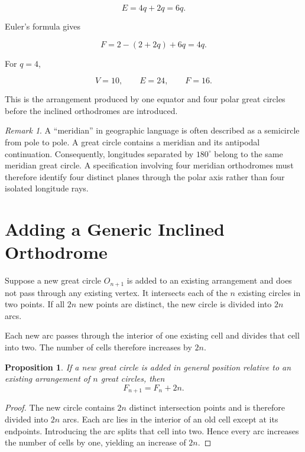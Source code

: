 \documentclass[11pt,fleqn]{book}
\numberwithin{equation}{chapter}
\theoremstyle{plain}
\newtheorem{proposition}[theorem]{Proposition}
\theoremstyle{definition}
\theoremstyle{remark}
\newtheorem{remark}[theorem]{Remark}
\begin{document}
\begin{equation}
    E=4q+2q=6q.
\end{equation}

Euler's formula gives

\begin{equation}
    F
    =
    2-(2+2q)+6q
    =
    4q.
\end{equation}

For \(q=4\),

\begin{equation}
    V=10,
    \qquad
    E=24,
    \qquad
    F=16.
\end{equation}

This is the arrangement produced by one equator and four polar great circles before the inclined orthodromes are introduced.

\begin{remark}
A ``meridian'' in geographic language is often described as a semicircle from pole to pole. A great circle contains a meridian and its antipodal continuation. Consequently, longitudes separated by \(180^\circ\) belong to the same meridian great circle. A specification involving four meridian orthodromes must therefore identify four distinct planes through the polar axis rather than four isolated longitude rays.
\end{remark}

\section{Adding a Generic Inclined Orthodrome}

Suppose a new great circle \(O_{n+1}\) is added to an existing arrangement and does not pass through any existing vertex. It intersects each of the \(n\) existing circles in two points. If all \(2n\) new points are distinct, the new circle is divided into \(2n\) arcs.

Each new arc passes through the interior of one existing cell and divides that cell into two. The number of cells therefore increases by \(2n\).

\begin{proposition}
If a new great circle is added in general position relative to an existing arrangement of \(n\) great circles, then
\[
F_{n+1}=F_n+2n.
\]
\end{proposition}

\begin{proof}
The new circle contains \(2n\) distinct intersection points and is therefore divided into \(2n\) arcs. Each arc lies in the interior of an old cell except at its endpoints. Introducing the arc splits that cell into two. Hence every arc increases the number of cells by one, yielding an increase of \(2n\).
\end{proof}
\end{document}

